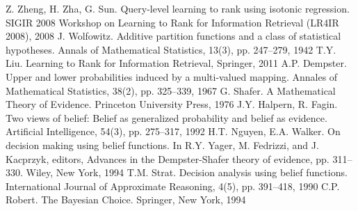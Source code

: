 \documentclass[12pt,a4paper,oneside]{article}
\begin{document}
\begin{multicols}{2}
\begin{thebibliography}{9}
	 Z. Zheng, H. Zha, G. Sun. Query-level learning to rank using isotonic regression. SIGIR 2008 Workshop on Learning to Rank for Information Retrieval (LR4IR 2008), 2008%
	 J. Wolfowitz. Additive partition functions and a class of statistical hypotheses. Annals of Mathematical Statistics, 13(3), pp. 247–279, 1942%
	 T.Y. Liu. Learning to Rank for Information Retrieval, Springer, 2011%
	 A.P. Dempster. Upper and lower probabilities induced by a multi-valued mapping. Annales of Mathematical Statistics, 38(2), pp. 325–339, 1967%
	 G. Shafer. A Mathematical Theory of Evidence. Princeton University Press, 1976%
	 J.Y. Halpern, R. Fagin. Two views of belief: Belief as generalized probability and belief as evidence. Artificial Intelligence, 54(3), pp. 275–317, 1992%
	 H.T. Nguyen,  E.A. Walker. On decision making using belief functions. In R.Y. Yager, M. Fedrizzi, and J. Kacprzyk, editors, Advances in the Dempster-Shafer theory of evidence, pp. 311–330. Wiley, New York, 1994%
	 T.M. Strat. Decision analysis using belief functions. International Journal of Approximate Reasoning, 4(5), pp. 391–418, 1990%
	 C.P. Robert. The Bayesian Choice. Springer, New York, 1994%
\end{thebibliography}

\end{multicols}
\end{document}
